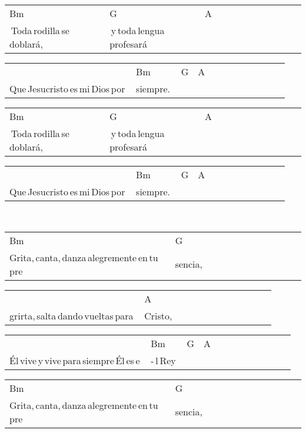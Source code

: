 \begin{multicols}{2}
\noindent
\begin{minipage}{\columnwidth}
\noindent
\noindent
\begin{tabular}{llllllllllll}
Bm&G&A\\
\quad\,Toda\,rodilla\,se\,doblará,\,\,\,\,&\quad\,y\,toda\,lengua\,profesará\,&
\end{tabular}

\noindent
\begin{tabular}{llllllllllll}
&Bm&G&A\\
Que\,Jesucristo\,es\,mi\,Dios\,por\,&siempre.\quad\,&\quad\,&
\end{tabular}

\noindent
\begin{tabular}{llllllllllll}
Bm&G&A\\
\quad\,Toda\,rodilla\,se\,doblará,\,\,\,\,&\quad\,y\,toda\,lengua\,profesará\,&
\end{tabular}

\noindent
\begin{tabular}{llllllllllll}
&Bm&G&A\\
Que\,Jesucristo\,es\,mi\,Dios\,por\,&siempre.\quad\,&\quad\,&
\end{tabular}
\end{minipage}\\

\noindent
\begin{minipage}{\columnwidth}
\noindent
\noindent
\begin{tabular}{llllllllllll}
Bm&G\\
Grita,\,canta,\,danza\,alegremente\,en\,tu\,pre&sencia,
\end{tabular}

\noindent
\begin{tabular}{llllllllllll}
&A\\
grirta,\,salta\,dando\,vueltas\,para\,&Cristo,
\end{tabular}

\noindent
\begin{tabular}{llllllllllll}
&Bm&G&A\\
Él\,vive\,y\,vive\,para\,siempre\,Él\,es\,e\,&-\,l\,Rey\quad\,&\,\quad\,&
\end{tabular}

\noindent
\begin{tabular}{llllllllllll}
Bm&G\\
Grita,\,canta,\,danza\,alegremente\,en\,tu\,pre&sencia,
\end{tabular}


\end{minipage}
\end{multicols}
